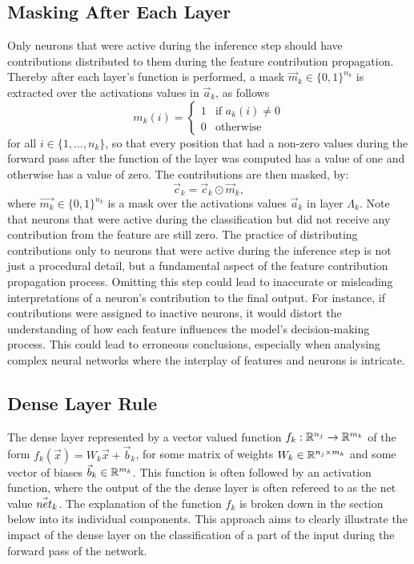 \subsection{Masking After Each Layer}
Only neurons that were active during the inference step should have contributions distributed to them during the feature contribution propagation. Thereby after each layer's function is performed, a mask $\vec{m}_k\in \{0,1\}^{n_k}$ is extracted over the activations values in $\vec{a}_k$, as follows 
\begin{equation*}
    \label{eq:masking}
    m_k(i) = \begin{cases}
    1 & \mbox{if $a_k(i)\not=0$}\\
    0 & \mbox{otherwise}
    \end{cases} 
\end{equation*}
for all $i \in \{1,\dots, n_k\}$, so that every position that had a non-zero values during the forward pass after the function of the layer was computed has a value of one and otherwise has a value of zero. The contributions are then masked, by:
    \begin{equation*}
    \label{masking}
        \vec{c}_k = \vec{c}_k\odot \vec{m}_k,
    \end{equation*}
where $\vec{m_k}\in \{0,1\}^{n_k}$ is a mask over the activations values $\vec{a}_k$ in layer $\Lambda_k$. Note that neurons that were active during the classification but did not receive any contribution from the feature are still zero. The practice of distributing contributions only to neurons that were active during the inference step is not just a procedural detail, but a fundamental aspect of the feature contribution propagation process. Omitting this step could lead to inaccurate or misleading interpretations of a neuron's contribution to the final output. For instance, if contributions were assigned to inactive neurons, it would distort the understanding of how each feature influences the model's decision-making process. This could lead to erroneous conclusions, especially when analysing complex neural networks where the interplay of features and neurons is intricate.


\subsection{Dense Layer Rule}
The dense layer represented by a vector valued function $f_k: \mathbb{R}^{n_j}\to \mathbb{R}^{m_k}$ of the form $f_k(\vec{x})= W_k \vec{x} + \vec{b}_k$, for some matrix of weights $W_k \in \mathbb{R}^{n_j\times m_k}$ and some vector of biases $\vec{b}_k \in \mathbb{R}^{m_k}$. This function is often followed by an activation function, where the output of the the dense layer is often refereed to as the net value $\vec{net}_{k}$. The explanation of the function $f_k$ is broken down in the section below into its individual components. This approach aims to clearly illustrate the impact of the dense layer on the classification of a part of the input during the forward pass of the network.

